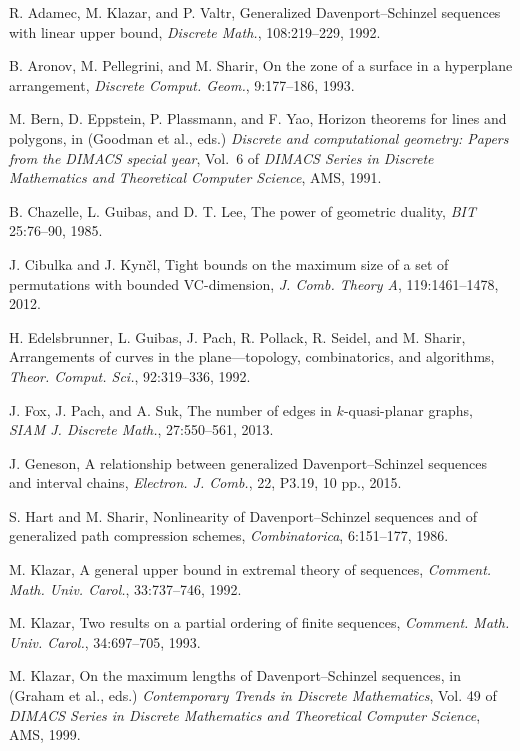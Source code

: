 \documentclass[11pt]{article}
\theoremstyle{definition}
\theoremstyle{remark}
\begin{document}
\begin{thebibliography}{99}
R. Adamec, M. Klazar, and P. Valtr, Generalized Davenport--Schinzel sequences with linear upper bound, \emph{Discrete Math.}, 108:219--229, 1992.

B. Aronov, M. Pellegrini, and M. Sharir, On the zone of a surface in a hyperplane arrangement, \emph{Discrete Comput. Geom.}, 9:177--186, 1993.

M. Bern, D. Eppstein, P. Plassmann, and F. Yao, Horizon theorems for lines and polygons, in (Goodman et al., eds.) \emph{Discrete and computational geometry: Papers from the DIMACS special year}, Vol.~6 of \emph{DIMACS Series in Discrete Mathematics and Theoretical Computer Science}, AMS, 1991.

B. Chazelle, L. Guibas, and D. T. Lee, The power of geometric duality, \emph{BIT} 25:76--90, 1985.

J. Cibulka and J. Kyn\v cl, Tight bounds on the maximum size of a set of permutations with bounded VC-dimension, \emph{J. Comb. Theory A}, 119:1461--1478, 2012.

H. Edelsbrunner, L. Guibas, J. Pach, R. Pollack, R. Seidel, and M. Sharir, Arrangements of curves in the plane---topology, combinatorics, and algorithms, \emph{Theor. Comput. Sci.}, 92:319--336, 1992.

J. Fox, J. Pach, and A. Suk, The number of edges in $k$-quasi-planar graphs, \emph{SIAM J. Discrete Math.}, 27:550--561, 2013.

J. Geneson, A relationship between generalized Davenport--Schinzel sequences and interval chains, \emph{Electron. J. Comb.}, 22, P3.19, 10 pp., 2015.

S. Hart and M. Sharir, Nonlinearity of Davenport--Schinzel sequences and of generalized path compression schemes, \emph{Combinatorica}, 6:151--177, 1986.

M. Klazar, A general upper bound in extremal theory of sequences, \emph{Comment. Math. Univ. Carol.}, 33:737--746, 1992.

M. Klazar, Two results on a partial ordering of finite sequences, \emph{Comment. Math. Univ. Carol.}, 34:697--705, 1993.

M. Klazar, On the maximum lengths of Davenport--Schinzel sequences, in (Graham et al., eds.) \emph{Contemporary Trends in Discrete Mathematics}, Vol. 49 of \emph{DIMACS Series in Discrete Mathematics and Theoretical Computer Science}, AMS, 1999.


\end{thebibliography}
\end{document}
